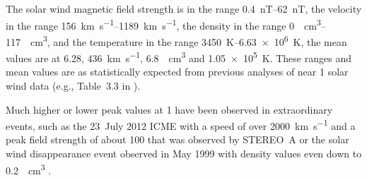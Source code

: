 The solar wind magnetic field strength is in the range \SIrange{0.4}{62}{nT}, the velocity in the range \SIrange{156}{1189}{\km\per\s}, the density in the range \SIrange{0}{117}{\per\cm\cubed}, and the temperature in the range \SIrange{3450}{6.63e6}{\K}, the mean values are at \SI{6.28}{\nT}, \SI{436}{\km\per\s}, \SI{6.8}{\per\cm\cubed} and \SI{1.05e5}{\K}. These ranges and mean values are as statistically expected from previous analyses of near \SI{1}{\au} solar wind data (e.g., Table~3.3 in \citet[p.~39]{Bothmer2007}).

Much higher or lower peak values at \SI{1}{\au} have been observed in extraordinary events, such as the 23~July 2012 ICME with a speed of over \SI{2000}{\km\per\s} and a peak field strength of about \SI{100}{\nT} that was observed by STEREO~A \citep{Russell2013} or the solar wind disappearance event observed in May 1999 with density values even down to \SI{0.2}{\per\cm\cubed} \citep{Lazarus2000}.\\


